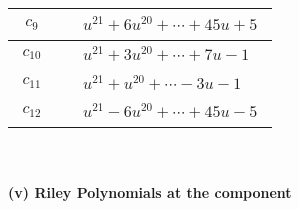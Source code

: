\documentclass[1p]{elsarticle_modified}
\theoremstyle{definition}
\begin{document}
\begin{tabular}{m{50pt}|m{274pt}}
\hline $$\begin{aligned}c_{9}\end{aligned}$$&$\begin{aligned}
&u^{21}+6 u^{20}+\cdots+45 u+5
\end{aligned}$\\
\hline $$\begin{aligned}c_{10}\end{aligned}$$&$\begin{aligned}
&u^{21}+3 u^{20}+\cdots+7 u-1
\end{aligned}$\\
\hline $$\begin{aligned}c_{11}\end{aligned}$$&$\begin{aligned}
&u^{21}+u^{20}+\cdots-3 u-1
\end{aligned}$\\
\hline $$\begin{aligned}c_{12}\end{aligned}$$&$\begin{aligned}
&u^{21}-6 u^{20}+\cdots+45 u-5
\end{aligned}$\\
\hline
\end{tabular}\\~\\
\newpage\renewcommand{\arraystretch}{1}
\flushleft \textbf{(v) Riley Polynomials at the component}\newline \\
\end{document}
